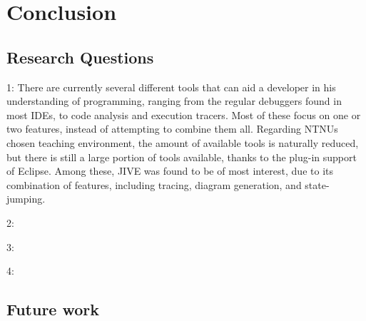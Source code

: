 \section{Conclusion}\label{conclusion}

\subsection{Research Questions}\label{conclusionRQs}
1: There are currently several different tools that can aid a developer in his understanding of programming, ranging from the regular debuggers found in most IDEs, to code analysis and execution tracers.
Most of these focus on one or two features, instead of attempting to combine them all.
Regarding NTNUs chosen teaching environment, the amount of available tools is naturally reduced, but there is still a large portion of tools available, thanks to the plug-in support of Eclipse.
Among these, JIVE was found to be of most interest, due to its combination of features, including tracing, diagram generation, and state-jumping.

2:

3:

4:
\subsection{Future work}\label{conclusionFuture}